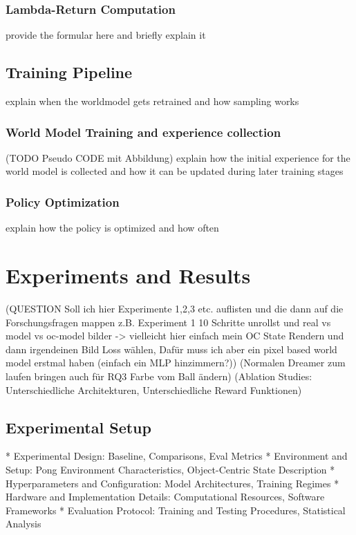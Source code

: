 \documentclass[
	english,
	ruledheaders=section,
	class=report,
	thesis={type=master},
	accentcolor=9c,
	custommargins=true,
	marginpar=false,
	parskip=half-,
	fontsize=11pt,
]{tudapub}
\begin{document}
\subsection{Lambda-Return Computation}
\label{subsec:lambda_returns}
provide the formular here and briefly explain it

\section{Training Pipeline}
\label{sec:training_pipeline}
explain when the worldmodel gets retrained and how sampling works

\subsection{World Model Training and experience collection}
\label{subsec:world_model_training}
(TODO Pseudo CODE mit Abbildung)
explain how the initial experience for the world model is collected and how it can be updated during later training stages

\subsection{Policy Optimization}
\label{subsec:policy_optimization}
explain how the policy is optimized and how often

\chapter{Experiments and Results}
\label{chap:experiments}
(QUESTION Soll ich hier Experimente 1,2,3 etc. auflisten und die dann auf die Forschungsfragen mappen
z.B. Experiment 1 10 Schritte unrollst und real vs model vs oc-model bilder -> vielleicht hier einfach
mein OC State Rendern und dann irgendeinen Bild Loss wählen, Dafür muss ich aber ein pixel based world model erstmal haben (einfach ein MLP hinzimmern?))
(Normalen Dreamer zum laufen bringen auch für RQ3 Farbe vom Ball ändern)
(Ablation Studies: Unterschiedliche Architekturen, Unterschiedliche Reward Funktionen)

\section{Experimental Setup}
\label{sec:exp_setup}
* Experimental Design: Baseline, Comparisons, Eval Metrics
* Environment and Setup: Pong Environment Characteristics, Object-Centric State Description
* Hyperparameters and Configuration: Model Architectures, Training Regimes
* Hardware and Implementation Details: Computational Resources, Software Frameworks
* Evaluation Protocol: Training and Testing Procedures, Statistical Analysis
\end{document}
